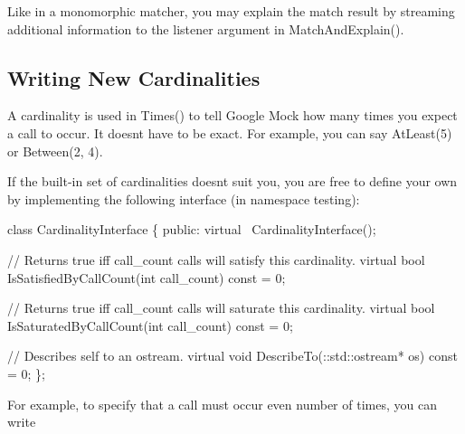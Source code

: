 Like in a monomorphic matcher, you may explain the match result by streaming additional information to the {\ttfamily listener} argument in {\ttfamily Match\+And\+Explain()}.

\subsection*{Writing New Cardinalities}

A cardinality is used in {\ttfamily Times()} to tell Google Mock how many times you expect a call to occur. It doesn\textquotesingle{}t have to be exact. For example, you can say {\ttfamily At\+Least(5)} or {\ttfamily Between(2, 4)}.

If the built-\/in set of cardinalities doesn\textquotesingle{}t suit you, you are free to define your own by implementing the following interface (in namespace {\ttfamily testing})\+:


\begin{DoxyCode}
\textcolor{keyword}{class }CardinalityInterface \{
 \textcolor{keyword}{public}:
  \textcolor{keyword}{virtual} ~CardinalityInterface();

  \textcolor{comment}{// Returns true iff call\_count calls will satisfy this cardinality.}
  \textcolor{keyword}{virtual} \textcolor{keywordtype}{bool} IsSatisfiedByCallCount(\textcolor{keywordtype}{int} call\_count) \textcolor{keyword}{const} = 0;

  \textcolor{comment}{// Returns true iff call\_count calls will saturate this cardinality.}
  \textcolor{keyword}{virtual} \textcolor{keywordtype}{bool} IsSaturatedByCallCount(\textcolor{keywordtype}{int} call\_count) \textcolor{keyword}{const} = 0;

  \textcolor{comment}{// Describes self to an ostream.}
  \textcolor{keyword}{virtual} \textcolor{keywordtype}{void} DescribeTo(::std::ostream* os) \textcolor{keyword}{const} = 0;
\};
\end{DoxyCode}


For example, to specify that a call must occur even number of times, you can write


